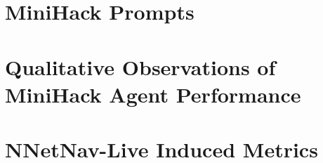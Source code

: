 \documentclass[../main.tex]{subfiles}
\begin{document}
\section{MiniHack Prompts}
\label{appendix:minihack_prompts}

\newpage

\section{Qualitative Observations of MiniHack Agent Performance}
\label{appendix:minihack_obs}


\section{NNetNav-Live Induced Metrics}
\label{appendix:nnetnav_live}

\end{document}
